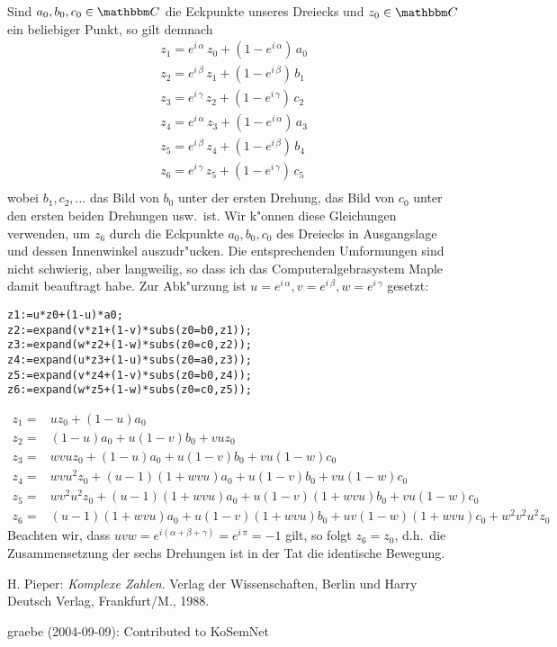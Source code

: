 \documentclass[11pt]{article}
\begin{document}
Sind $a_0,b_0,c_0\in {\C}$ die Eckpunkte unseres Dreiecks und $z_0\in {\C}$
ein beliebiger Punkt, so gilt demnach
\[\begin{array}{c}
z_1=e^{i\,\alpha}\,z_0 + (1-e^{i\,\alpha})\,a_0\\
z_2=e^{i\,\beta}\,z_1 + (1-e^{i\,\beta})\,b_1\\
z_3=e^{i\,\gamma}\,z_2 + (1-e^{i\,\gamma})\,c_2\\
z_4=e^{i\,\alpha}\,z_3 + (1-e^{i\,\alpha})\,a_3\\
z_5=e^{i\,\beta}\,z_4 + (1-e^{i\,\beta})\,b_4\\
z_6=e^{i\,\gamma}\,z_5 + (1-e^{i\,\gamma})\,c_5\\
\end{array}\]
wobei $b_1, c_2,\ldots$ das Bild von $b_0$ unter der ersten Drehung, das Bild
von $c_0$ unter den ersten beiden Drehungen usw.\ ist. Wir k"onnen diese
Gleichungen verwenden, um $z_6$ durch die Eckpunkte $a_0,b_0,c_0$ des Dreiecks
in Ausgangslage und dessen Innenwinkel auszudr"ucken.  Die entsprechenden
Umformungen sind nicht schwierig, aber langweilig, so dass ich das
Computeralgebrasystem {\sc Maple} damit beauftragt habe. Zur Abk"urzung ist
$u=e^{i\,\alpha}, v=e^{i\,\beta}, w=e^{i\,\gamma}$ gesetzt:
\begin{verbatim}
z1:=u*z0+(1-u)*a0;
z2:=expand(v*z1+(1-v)*subs(z0=b0,z1));
z3:=expand(w*z2+(1-w)*subs(z0=c0,z2));
z4:=expand(u*z3+(1-u)*subs(z0=a0,z3));
z5:=expand(v*z4+(1-v)*subs(z0=b0,z4));
z6:=expand(w*z5+(1-w)*subs(z0=c0,z5));
\end{verbatim}
\begin{align*}
z_1=&u{z_0}+(1-u){a_0}\\ 
z_2=&(1-u){a_0}+u(1-v){b_0}+vu{z_0}\\
z_3=&wvu{z_0}+(1-u){a_0}+u(1-v){b_0}+ vu(1-w){c_0}\\
z_4=&wvu^2{z_0}+(u-1)(1+wvu){a_0}+u(1-v){b_0}+vu(1-w){c_0}\\
z_5=&wv^2u^2{z_0}+(u-1)(1+wvu){a_0}+u(1-v)(1+wvu){b_0}+vu(1-w){c_0}\\
z_6=&(u-1)(1+wvu){a_0}+u(1-v)(1+wvu){b_0}+uv(1-w)(1+wvu){c_0}+w^2v^2u^2{z_0}
\end{align*}
Beachten wir, dass $uvw=e^{i(\alpha+\beta+\gamma)}=e^{i\,\pi}=-1$ gilt, so
folgt $z_6=z_0$, d.h.\ die Zusammensetzung der sechs Drehungen ist in der Tat
die identische Bewegung.


\begin{thebibliography}{xxx}
 H. Pieper: {\em Komplexe Zahlen}. Verlag der Wissenschaften,
  Berlin und Harry Deutsch Verlag, Frankfurt/M., 1988.
\end{thebibliography}

\begin{attribution}
graebe (2004-09-09): Contributed to KoSemNet
\end{attribution}
\end{document}
